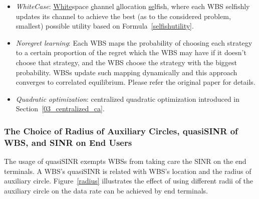 \documentclass[times]{ettauth}
\theoremstyle{mytheoremstyle}
\theoremstyle{mytheoremstyle}
\theoremstyle{mytheoremstyle}
\begin{document}
\begin{itemize}
\item \textit{WhiteCase}:  \underline{White}space \underline{c}hannel \underline{a}llocation \underline{se}lfish, where each WBS selfishly updates its channel to achieve the best (as to the considered problem, smallest) possible utility based on Formula~\ref{selfishutility}.

\item \textit{Noregret learning}: Each WBS maps the probability of choosing each strategy to a certain proportion of the regret which the WBS may have if it doesn't choose that strategy, and the WBS choose the strategy with the biggest probability.  
WBSs update such mapping dynamically and this approach converges to correlated equilibrium. 
Please refer the original paper \cite{hart00correlatedeq} for details.
		
\item \textit{Quadratic optimization}: centralized quadratic optimization introduced in Section~\ref{03_centralized_ca}.
\end{itemize}


\subsubsection*{The Choice of Radius of Auxiliary Circles, quasiSINR of WBS, and SINR on End Users}
The usage of quasiSINR exempts WBSs from taking care the SINR on the end terminals.
A WBS's quasiSINR is related with WBS's location and the radius of auxiliary circle.
Figure~\ref{radius} illustrates the effect of using different radii of the auxiliary circle on the data rate can be achieved by end terminals.
\end{document}
